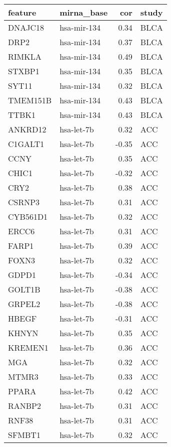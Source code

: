 \begin{table}[ht]
\centering
\begin{tabular}{llrl}
  \hline
feature & mirna\_base & cor & study \\ 
  \hline
DNAJC18 & hsa-mir-134 & 0.34 & BLCA \\ 
  DRP2 & hsa-mir-134 & 0.37 & BLCA \\ 
  RIMKLA & hsa-mir-134 & 0.49 & BLCA \\ 
  STXBP1 & hsa-mir-134 & 0.35 & BLCA \\ 
  SYT11 & hsa-mir-134 & 0.32 & BLCA \\ 
  TMEM151B & hsa-mir-134 & 0.43 & BLCA \\ 
  TTBK1 & hsa-mir-134 & 0.43 & BLCA \\ 
  ANKRD12 & hsa-let-7b & 0.32 & ACC \\ 
  C1GALT1 & hsa-let-7b & -0.35 & ACC \\ 
  CCNY & hsa-let-7b & 0.35 & ACC \\ 
  CHIC1 & hsa-let-7b & -0.32 & ACC \\ 
  CRY2 & hsa-let-7b & 0.38 & ACC \\ 
  CSRNP3 & hsa-let-7b & 0.31 & ACC \\ 
  CYB561D1 & hsa-let-7b & 0.32 & ACC \\ 
  ERCC6 & hsa-let-7b & 0.31 & ACC \\ 
  FARP1 & hsa-let-7b & 0.39 & ACC \\ 
  FOXN3 & hsa-let-7b & 0.32 & ACC \\ 
  GDPD1 & hsa-let-7b & -0.34 & ACC \\ 
  GOLT1B & hsa-let-7b & -0.38 & ACC \\ 
  GRPEL2 & hsa-let-7b & -0.38 & ACC \\ 
  HBEGF & hsa-let-7b & -0.31 & ACC \\ 
  KHNYN & hsa-let-7b & 0.35 & ACC \\ 
  KREMEN1 & hsa-let-7b & 0.36 & ACC \\ 
  MGA & hsa-let-7b & 0.32 & ACC \\ 
  MTMR3 & hsa-let-7b & 0.33 & ACC \\ 
  PPARA & hsa-let-7b & 0.42 & ACC \\ 
  RANBP2 & hsa-let-7b & 0.31 & ACC \\ 
  RNF38 & hsa-let-7b & 0.31 & ACC \\ 
  SFMBT1 & hsa-let-7b & 0.32 & ACC \\ 

\end{tabular}
\end{table}
